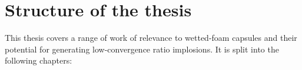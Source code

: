 
\section{Structure of the thesis}

This thesis covers a range of work of relevance to wetted-foam capsules and their potential for generating low-convergence ratio implosions. It is split into the following chapters:

